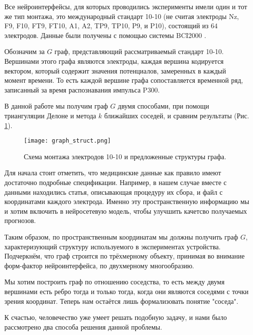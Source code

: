 \documentclass[12pt]{article}
\begin{document}
Все нейроинтерфейсы, для которых проводились эксперименты имели один и тот же тип монтажа, это международный стандарт 10-10 (не считая электроды Nz, F9, F10, FT9, FT10, A1, A2, TP9, TP10, P9, и P10), состоящий из $64$ электродов. Данные были получены с помощью системы BCI2000 \cite{wolpaw2002brain}.

Обозначим за $G$ граф, представляющий рассматриваемый стандарт 10-10.  Вершинами этого графа являются электроды, каждая вершина кодируется вектором, который содержит значения потенциалов, замеренных в каждый момент времени. То есть каждой вершине графа сопоставляется временной ряд, записанный за время распознавания импульса P300.

В данной работе мы получим граф $G$ двумя способами, при помощи триангуляции Делоне и метода $k$ ближайших соседей, и сравним результаты (Рис. \ref{graph_struct}).

\begin{figure}[ht]
        \centering
        \texttt{[image: graph\_struct.png]}
        \caption{Схема монтажа электродов 10-10 и предложенные структуры графа.}
        \label{graph_struct}
    \end{figure}
    
Для начала стоит отметить, что медицинские данные как правило имеют достаточно подробные спецификации. Например, в нашем случае вместе с данными находились статья, описывающая процедуру их сбора, и файл с координатами каждого электрода. Именно эту пространственную информацию мы и хотим включить в нейросетевую модель, чтобы улучшить качетсво получаемых прогнозов.

Таким образом, по пространственным координатам мы должны получить граф $G$, характеризующий структуру используемого в экспериментах устройства. Подчеркнём, что граф строится по трёхмерному объекту, принимая во внимание форм-фактор нейроинтерфейса, по двухмерному многообразию. 

Мы хотим построить граф по отношению соседства, то есть между двумя вершинами есть ребро тогда и только тогда, когда они являются соседями с точки зрения координат. Теперь нам остаётся лишь формализовать понятие "соседа". 

К счастью, человечество уже умеет решать подобную задачу, и нами было рассмотрено два способа решения данной проблемы.
\end{document}
